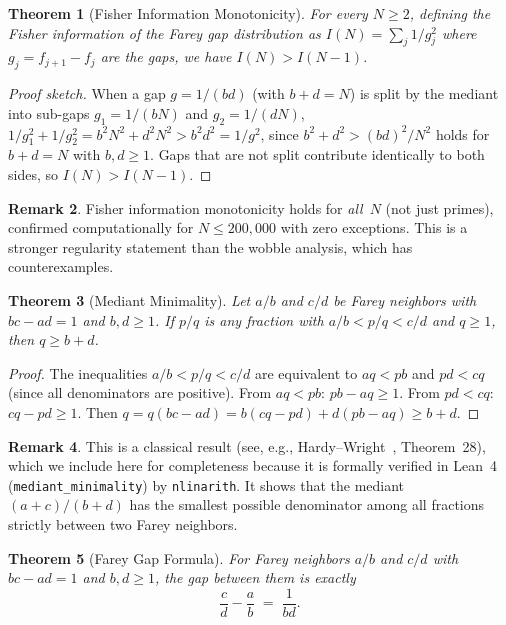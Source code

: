 \documentclass[11pt]{article}
\newtheorem{theorem}{Theorem}[section]
\theoremstyle{definition}
\newtheorem{remark}[theorem]{Remark}
\begin{document}
\begin{theorem}[Fisher Information Monotonicity]\label{thm:fisher}
For every $N \ge 2$, defining the Fisher information of the
Farey gap distribution as $I(N) = \sum_{j} 1/g_j^2$ where
$g_j = f_{j+1} - f_j$ are the gaps, we have $I(N) > I(N-1)$.
\end{theorem}

\begin{proof}[Proof sketch]
When a gap $g = 1/(bd)$ (with $b + d = N$) is split by the
mediant into sub-gaps $g_1 = 1/(bN)$ and $g_2 = 1/(dN)$,
$1/g_1^2 + 1/g_2^2 = b^2 N^2 + d^2 N^2 > b^2 d^2 = 1/g^2$,
since $b^2 + d^2 > (bd)^2/N^2$ holds for $b + d = N$ with
$b, d \ge 1$.  Gaps that are not split contribute identically
to both sides, so $I(N) > I(N-1)$.
\end{proof}

\begin{remark}
Fisher information monotonicity holds for \emph{all}~$N$
(not just primes), confirmed computationally for
$N \le 200{,}000$ with zero exceptions.  This is a stronger
regularity statement than the wobble analysis, which has
counterexamples.
\end{remark}

\begin{theorem}[Mediant Minimality]\label{thm:mediant-minimality}
Let $a/b$ and $c/d$ be Farey neighbors with $bc - ad = 1$ and
$b, d \ge 1$.  If $p/q$ is any fraction with $a/b < p/q < c/d$
and $q \ge 1$, then $q \ge b + d$.
\end{theorem}

\begin{proof}
The inequalities $a/b < p/q < c/d$ are equivalent to
$aq < pb$ and $pd < cq$ (since all denominators are positive).
From $aq < pb$: $pb - aq \ge 1$.  From $pd < cq$: $cq - pd \ge 1$.
Then $q = q(bc - ad) = b(cq - pd) + d(pb - aq) \ge b + d$.
\end{proof}

\begin{remark}
This is a classical result (see, e.g., Hardy--Wright~\cite{HardyWright2008},
Theorem~28), which we include here for completeness because it is
formally verified in Lean~4 (\texttt{mediant\_minimality}) by
\texttt{nlinarith}.  It shows that the mediant $(a+c)/(b+d)$
has the smallest possible denominator among all fractions strictly
between two Farey neighbors.
\end{remark}

\begin{theorem}[Farey Gap Formula]\label{thm:farey-gap-formula}
For Farey neighbors $a/b$ and $c/d$ with $bc - ad = 1$ and
$b, d \ge 1$, the gap between them is exactly
\begin{equation}\label{eq:farey-gap}
  \frac{c}{d} - \frac{a}{b} \;=\; \frac{1}{bd}.
\end{equation}
\end{theorem}
\end{document}
